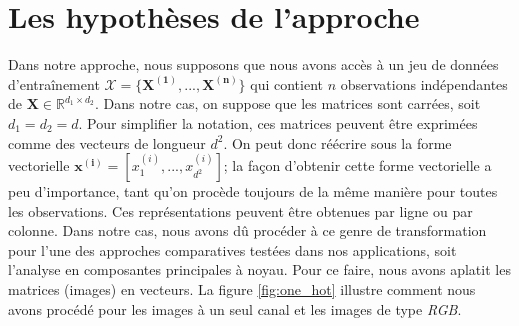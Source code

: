 \section{Les hypothèses de l'approche}

Dans notre approche, nous supposons que  nous avons accès à un jeu de données d'entraînement $\mathcal{X} = \{\boldsymbol{X^{(1)}}, ..., \boldsymbol{X^{(n)}}\}$ qui contient $n$ observations indépendantes de $\mathbf{X} \in \mathbb{R}^{d_1 \times d_2}$. Dans notre cas, on suppose que les matrices sont carrées, soit $d_1=d_2=d$. Pour simplifier la notation, ces matrices peuvent être exprimées comme des vecteurs de longueur $d^2$. On peut donc réécrire sous la forme vectorielle $\boldsymbol{x^{(i)}} = [x^{(i)}_1,...,x^{(i)}_{d^2}]$; la façon d'obtenir cette forme vectorielle a peu d'importance, tant qu'on procède toujours de la même manière pour toutes les observations. Ces représentations peuvent être obtenues par ligne ou par colonne. Dans notre cas, nous avons dû procéder à ce genre de transformation pour l'une des approches comparatives testées dans nos applications, soit l'analyse en composantes principales à noyau. Pour ce faire, nous avons aplatit les matrices (images) en vecteurs. La figure \ref{fig:one_hot} illustre comment nous avons procédé pour les images à un seul canal et les images de type \textit{RGB}.

